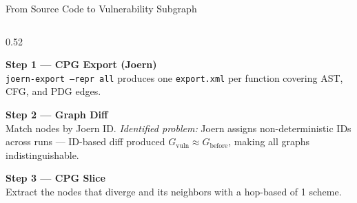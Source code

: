 \documentclass[aspectratio=169,10pt]{beamer}
\begin{document}
\begin{frame}{From Source Code to Vulnerability Subgraph}
\begin{columns}[T]
\begin{column}{0.52\textwidth}

  \textbf{Step 1 — CPG Export (Joern)}\\[2pt]
  \texttt{joern-export --repr all} produces one
  \texttt{export.xml} per function covering
  AST, CFG, and PDG edges.

  \vspace{0.8em}
  \textbf{Step 2 — Graph Diff}\\[2pt]
  Match nodes by Joern ID.
  \textit{Identified problem:} Joern assigns non-deterministic IDs across runs — ID-based
  diff produced $G_{\text{vuln}} \approx G_{\text{before}}$,
  making all graphs indistinguishable.



  \vspace{0.6em}
  \textbf{Step 3 — CPG Slice}\\[2pt]
  Extract the nodes that diverge and its neighbors with a hop-based of 1 scheme.



\end{column}
\end{columns}
\end{frame}
\end{document}
